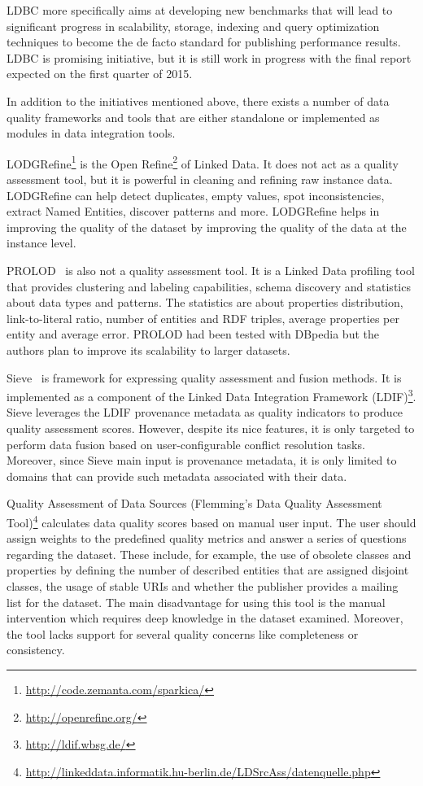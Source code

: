 \documentclass[onecolumn, crcready]{../../Util/LaTEX/iosart2c}
\begin{document}
LDBC more specifically aims at developing new benchmarks that will lead to significant progress in scalability, storage, indexing and query optimization techniques to become the de facto standard for publishing performance results. LDBC is promising initiative, but it is still work in progress with the final report expected on the first quarter of 2015.

In addition to the initiatives mentioned above, there exists a number of data quality frameworks and tools that are either standalone or implemented as modules in data integration tools.

LODGRefine\footnote{\url{http://code.zemanta.com/sparkica/}} is the Open Refine\footnote{\url{http://openrefine.org/}} of Linked Data. It does not act as a quality assessment tool, but it is powerful in cleaning and refining raw instance data. LODGRefine can help detect duplicates, empty values, spot inconsistencies, extract Named Entities, discover patterns and more. LODGRefine helps in improving the quality of the dataset by improving the quality of the data at the instance level.


PROLOD~\cite{Bohm:ICDEW:10} is also not a quality assessment tool. It is a Linked Data profiling tool that provides clustering and labeling capabilities, schema discovery and statistics about data types and patterns. The statistics are about properties distribution, link-to-literal ratio, number of entities and RDF triples, average properties per entity and average error. PROLOD had been tested with DBpedia but the authors plan to improve its scalability to larger datasets.


Sieve~\cite{Mendes:EDBT:12} is framework for expressing quality assessment and fusion methods. It is implemented as a component of the Linked Data Integration Framework (LDIF)\footnote{\url{http://ldif.wbsg.de/}}. Sieve leverages the LDIF provenance metadata as quality indicators to produce quality assessment scores. However, despite its nice features, it is only targeted to perform data fusion based on user-configurable conflict resolution tasks. Moreover, since Sieve main input is provenance metadata, it is only limited to domains that can provide such metadata associated with their data.


Quality Assessment of Data Sources (Flemming's Data Quality Assessment Tool)\footnote{\url{http://linkeddata.informatik.hu-berlin.de/LDSrcAss/datenquelle.php}} calculates data quality scores based on manual user input. The user should assign weights to the predefined quality metrics and answer a series of questions regarding the dataset. These include, for example, the use of obsolete classes and properties by defining the number of described entities that are assigned disjoint classes, the usage of stable URIs and whether the publisher provides a mailing list for the dataset. The main disadvantage for using this tool is the manual intervention which requires deep knowledge in the dataset examined. Moreover, the tool lacks support for several quality concerns like completeness or consistency.
\end{document}
